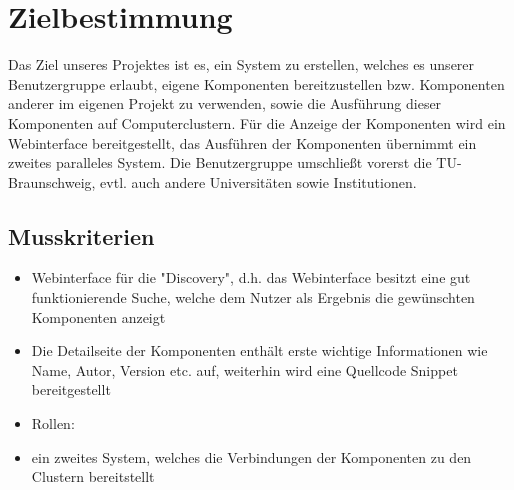 
\chapter{Zielbestimmung}



Das Ziel unseres Projektes ist es, ein System zu erstellen, welches es unserer Benutzergruppe erlaubt, eigene Komponenten bereitzustellen bzw. Komponenten anderer im eigenen Projekt zu verwenden, sowie die Ausführung dieser Komponenten auf Computerclustern. Für die Anzeige der Komponenten wird ein Webinterface bereitgestellt, das Ausführen der Komponenten übernimmt ein zweites paralleles System.
Die Benutzergruppe umschließt vorerst die TU-Braunschweig, evtl. auch andere Universitäten sowie Institutionen. 
 

\section{Musskriterien}


\begin{itemize}
\item Webinterface für die "Discovery", d.h. das Webinterface besitzt eine gut funktionierende Suche, welche dem Nutzer als Ergebnis die gewünschten Komponenten anzeigt
\item Die Detailseite der Komponenten enthält erste wichtige Informationen wie Name, Autor, Version etc. auf, weiterhin wird eine Quellcode
Snippet bereitgestellt
\item Rollen: 
\item ein zweites System, welches die Verbindungen der Komponenten zu den Clustern bereitstellt
\end{itemize}

